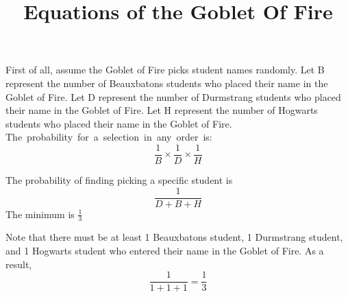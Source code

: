 \documentclass{article}
\title{Equations of the Goblet Of Fire}
\date{}
\begin{document}
\maketitle

\par
First of all, assume the Goblet of Fire picks student names randomly. \newline
Let B represent the number of Beauxbatons students who placed their name in the Goblet of Fire. \newline
Let D represent the number of Durmstrang students who placed their name in the Goblet of Fire. \newline
Let H represent the number of Hogwarts students who placed their name in the Goblet of Fire. \newline
\newline
\mbox{The probability for a selection in any order is: }
$$\frac{1}{B} \times \frac{1}{D} \times \frac{1}{H}$$

The probability of finding picking a specific student is
$$\frac{1}{D + B + H}$$
\newline
The minimum is
\( \frac{1}{3} \)

Note that there must be at least 1 Beauxbatons student, 1 Durmstrang student, and 1 Hogwarts student who entered their name in the Goblet of Fire. As a result,
$$\frac{1}{1 + 1 + 1} = \frac{1}{3}$$
\end{document}
